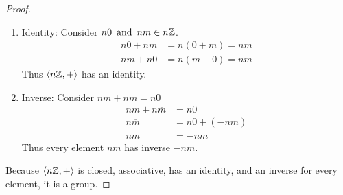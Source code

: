 \documentclass{article}
\begin{document}
\begin{enumerate}
{\begin{enumerate}
{\begin{proof}
\begin{enumerate}
                        \item Identity: Consider $n0 \operatorname{~\text{and}~} nm \in n\mathbb{Z}$.
                        \begin{align*}
                            n0 + nm & = n(0+m) = nm \\
                            nm + n0 & = n(m+0) = nm
                        \end{align*}
                        Thus $\langle n\mathbb{Z}, + \rangle$ has an identity.

                        \item Inverse: Consider $nm + n\overline{m} = n0$
                        \begin{align*}
                            nm + n\overline{m} & = n0 \\
                            n\overline{m} & = n0 + (-nm) \\
                            n\overline{m} & = -nm
                        \end{align*}
                        Thus every element $nm$ has inverse $-nm$.
                    \end{enumerate}
                    Because $\langle n\mathbb{Z}, + \rangle$ is closed, associative, has an identity, and an inverse for every element, it is a group.
                \end{proof}
            }
\end{enumerate}}
\end{enumerate}
\end{document}
